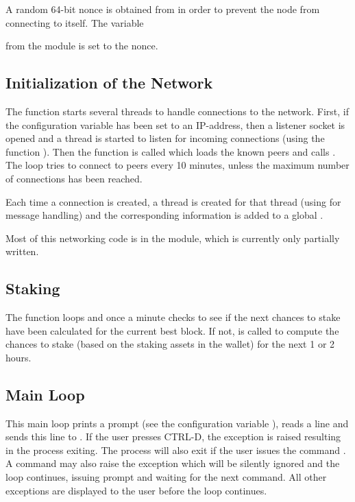 A random 64-bit nonce is obtained from {} in order to prevent
the node from connecting to itself.
The variable {\var{this\_nodes\_nonce]} from the {} module
is set to the nonce.

\subsection{Initialization of the Network}\label{sec:initnetwork}

The {} function starts several threads to
handle connections to the network.
First, if the configuration variable {}
has been set to an IP-address, then
a listener socket is opened and a thread
is started to listen for incoming connections (using
the function {}).
Then the function {} is called which
loads the known peers
and calls {}.
The loop tries to connect to peers
every 10 minutes, unless the maximum number of connections has been reached.

Each time a connection is created, a thread is created for that thread
(using {} for message handling)
and the corresponding information is added to a global {}.

Most of this networking code is in the {} module, which is
currently only partially written.

\subsection{Staking}\label{sec:stakingthread}

The function {} loops
and once a minute checks to see if
the next chances to stake have been calculated
for the current best block.
If not, {}
is called to compute the chances to stake
(based on the staking assets in the wallet)
for the next 1 or 2 hours.

\subsection{Main Loop}\label{sec:mainloop}

This main loop prints a prompt (see the configuration variable {}),
reads a line and sends this line to {}.
If the user presses CTRL-D, the {} exception is raised
resulting in the process exiting.
The process will also exit if the user issues the command {}.
A command may also raise the exception {} which will be silently ignored
and the loop continues, issuing prompt and waiting for the next command.
All other exceptions are displayed to the user before the loop continues.

}
